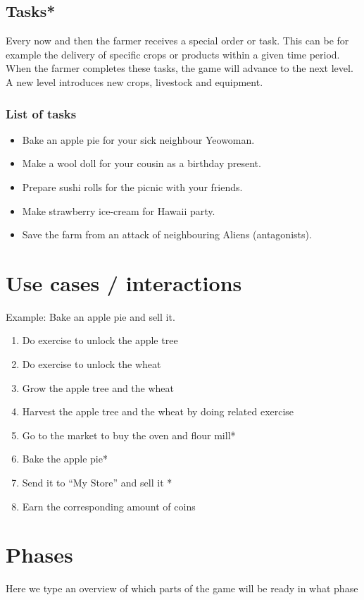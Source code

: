 \documentclass[a4paper,11pt,notitlepage]{report}
\begin{document}
\subsection{Tasks*}
Every now and then the farmer receives a special order or task. This can be for example the delivery of specific crops or products within a given time period. When the farmer completes these tasks, the game will advance to the next level. A new level introduces new crops, livestock and equipment.

\subsubsection{List of tasks}
\begin{itemize}
\item Bake an apple pie for your sick neighbour Yeowoman.
\item Make a wool doll for your cousin as a birthday present.
\item Prepare sushi rolls for the picnic with your friends.
\item Make strawberry ice-cream for Hawaii party.
\item Save the farm from an attack of neighbouring Aliens (antagonists).
\end{itemize}

\section{Use cases / interactions}
Example: Bake an apple pie and sell it.
\begin{enumerate}
\item Do exercise to unlock the apple tree
\item Do exercise to unlock the wheat
\item Grow the apple tree and the wheat
\item Harvest the apple tree and the wheat by doing related exercise
\item Go to the market to buy the oven and flour mill*
\item Bake the apple pie*
\item Send it to “My Store” and sell it *
\item Earn the corresponding amount of coins
\end{enumerate}

\section{Phases}
Here we type an overview of which parts of the game will be ready in what phase
\end{document}
